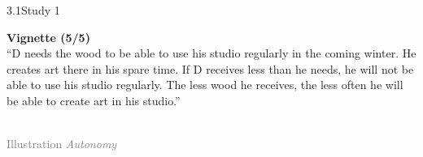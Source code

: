 \documentclass[xcolor=table,9pt,aspectratio=169]{beamer}
\begin{document}
\begin{frame}{\vspace*{10mm}3.1\hspace*{1em}Study 1}
\begin{multicols}{2}
   \textbf{Vignette (5/5)}\\
   \medskip
   \enquote{D needs the wood to be able to use his studio regularly in the coming winter.
   He creates art there in his spare time.
   If D receives less than he needs, he will not be able to use his studio regularly.
   The less wood he receives, the less often he will be able to create art in his studio.}
   \vfill
   \begin{center}
      \\
      \textcolor{gray}{Illustration \textit{Autonomy}}
   \end{center}
\end{multicols}
\end{frame}
\end{document}
